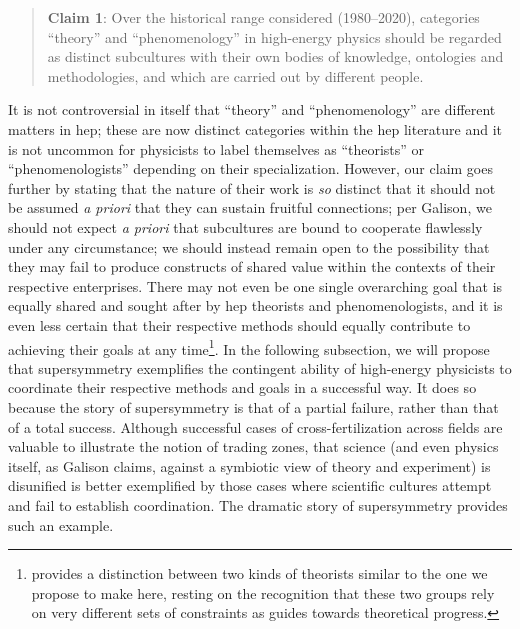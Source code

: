 \documentclass[smallextended]{svjour3}
\begin{document}
\begin{quote}
    \textbf{Claim 1}: Over the historical range considered (1980--2020), categories ``theory'' and ``phenomenology'' in high-energy physics should be regarded as distinct subcultures with their own bodies of knowledge, ontologies and methodologies, and which are carried out by different people.
\end{quote}

 It is not controversial in itself that ``theory'' and ``phenomenology'' are different matters in \gls{hep}; these are now distinct categories within the \gls{hep} literature and it is not uncommon for physicists to label themselves as ``theorists'' or ``phenomenologists'' depending on their specialization. However, our claim goes further by stating that the nature of their work is \textit{so} distinct that it should not be assumed \textit{a priori} that they can sustain fruitful connections; per Galison, we should not expect \textit{a priori} that subcultures are bound to cooperate flawlessly under any circumstance; we should instead remain open to the possibility that they may fail to produce constructs of shared value within the contexts of their respective enterprises. There may not even be one single overarching goal that is equally shared and sought after by \gls{hep} theorists and phenomenologists, and it is even less certain that their respective methods should equally contribute to achieving their goals at any time\footnote{\citealt{Galison1995} provides a distinction between two kinds of theorists similar to the one we propose to make here, resting on the recognition that these two groups rely on very different sets of constraints as guides towards theoretical progress.}. In the following subsection, we will propose that supersymmetry exemplifies the contingent ability of high-energy physicists to coordinate their respective methods and goals in a successful way. It does so because the story of supersymmetry is that of a partial failure, rather than that of a total success. Although successful cases of cross-fertilization across fields are valuable to illustrate the notion of trading zones, that science (and even physics itself, as Galison claims, against a symbiotic view of theory and experiment) is disunified is better exemplified by those cases where scientific cultures attempt and fail to establish coordination. The dramatic story of supersymmetry provides such an example.

\end{document}
